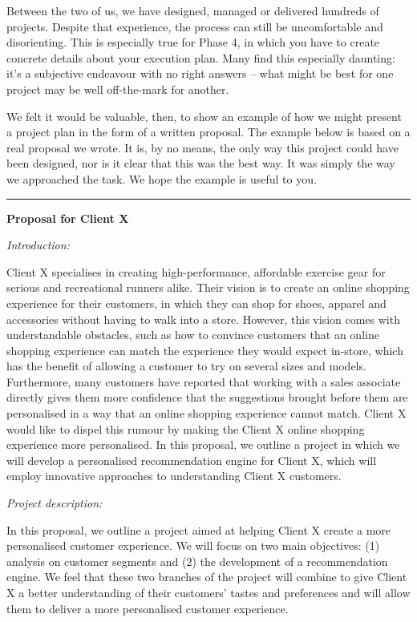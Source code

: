 \documentclass[
]{book}
\begin{document}
Between the two of us, we have designed, managed or delivered hundreds
of projects. Despite that experience, the process can still be
uncomfortable and disorienting. This is especially true for Phase 4, in
which you have to create concrete details about your execution plan.
Many find this especially daunting: it's a subjective endeavour with no
right answers -- what might be best for one project may be well
off-the-mark for another.

We felt it would be valuable, then, to show an example of how we might
present a project plan in the form of a written proposal. The example
below is based on a real proposal we wrote. It is, by no means, the only
way this project could have been designed, nor is it clear that this was
the best way. It was simply the way we approached the task. We hope the
example is useful to you.

\begin{center}\rule{0.5\linewidth}{0.5pt}\end{center}

\textbf{Proposal for Client X}

\emph{Introduction:}

Client X specialises in creating high-performance, affordable exercise
gear for serious and recreational runners alike. Their vision is to
create an online shopping experience for their customers, in which they
can shop for shoes, apparel and accessories without having to walk into
a store. However, this vision comes with understandable obstacles, such
as how to convince customers that an online shopping experience can
match the experience they would expect in-store, which has the benefit
of allowing a customer to try on several sizes and models. Furthermore,
many customers have reported that working with a sales associate
directly gives them more confidence that the suggestions brought before
them are personalised in a way that an online shopping experience cannot
match. Client X would like to dispel this rumour by making the Client X
online shopping experience more personalised. In this proposal, we
outline a project in which we will develop a personalised recommendation
engine for Client X, which will employ innovative approaches to
understanding Client X customers.

\emph{Project description:}

In this proposal, we outline a project aimed at helping Client X create
a more personalised customer experience. We will focus on two main
objectives: (1) analysis on customer segments and (2) the development of
a recommendation engine. We feel that these two branches of the project
will combine to give Client X a better understanding of their customers'
tastes and preferences and will allow them to deliver a more
personalised customer experience.
\end{document}
